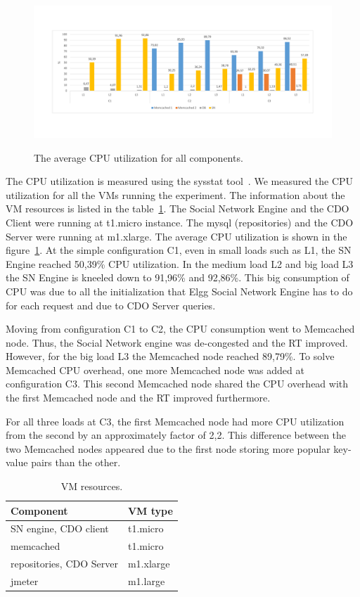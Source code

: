 \begin{figure}[h]
	\caption{The average CPU utilization for all components.}
	\includegraphics[width=1.1\textwidth,natwidth=200,natheight=250]{./fig/UsageAVG.pdf} 
	\centering
	\label{fig:cpuavg}
\end{figure}

The CPU utilization is measured using the sysstat tool~\cite{sysstat_url}. We measured the CPU utilization for all the VMs running the experiment. The information about the VM resources is listed in the table~\ref{vms_resources}. The Social Network Engine and the CDO Client were running at t1.micro instance. The mysql (repositories) and the CDO Server were running at m1.xlarge. The average CPU utilization is shown in the figure~\ref{fig:cpuavg}. At the simple configuration C1, even in small loads such as L1, the SN Engine reached 50,39\% CPU utilization. In the medium load L2 and big load L3 the SN Engine is kneeled down to 91,96\% and 92,86\%. This big consumption of CPU was due to all the initialization that Elgg Social Network Engine has to do for each request and due to CDO Server queries.

Moving from configuration C1 to C2, the CPU consumption went to Memcached node. Thus, the Social Network engine was de-congested and the RT improved. However, for the big load L3 the Memcached node reached 89,79\%. To solve Memcached CPU overhead, one more Memcached node was added at configuration C3. This second Memcached node shared the CPU overhead with the first Memcached node and the RT improved furthermore. 

For all three loads at C3, the first Memcached node had more CPU utilization from the second by an approximately factor of 2,2. This difference between the two Memcached nodes appeared due to the first node storing more popular key-value pairs than the other.

\begin{table}[]
\centering
\caption{VM resources. }
\label{vms_resources}
\begin{tabular}{|l|l|}
\hline
 Component &  VM type \\ \hline
 SN engine, CDO client &  t1.micro \\ \hline
 memcached &  t1.micro \\ \hline
 repositories, CDO Server &  m1.xlarge \\ \hline
 jmeter &  m1.large \\ \hline
\end{tabular}
\end{table}

